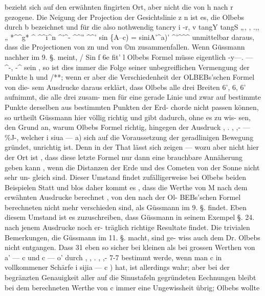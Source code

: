 \documentclass[10pt,a4paper]{article}
\begin{document}
bezieht  sich  auf  den  erwähnten  fingirten  Ort,  aber  nicht  die  von  h  nach  r  gezogene.    Die  Neigung  der
Projection  der  Gesichtslinie   z  n  ist  es,   die  Olbebs  durch  b\glqq{}   bezeichnet  und   für   die   also  nothwendig
tancry\glqq{}  \textbullet{}   i      -r,  v  tangY\glqq{}  tangS\glqq{}  „,    ,  .,,  „
*\textasciicircum{}\textasciicircum{}g*  \textasciicircum{}  \textasciicircum{}\textasciicircum{}i\textasciicircum{}n  \textasciicircum{}'\textasciicircum{}-  \textasciicircum{}\textasciicircum{}''  \glqq{}\glqq{}\glqq{}  \textasciicircum{}\textasciicircum{}'\glqq{}  sin  \{A\glqq{}--c\glqq{})  =  siniA'\textasciicircum{}a\glqq{})'  \textasciicircum{}'\textasciicircum{}\textasciicircum{}\textasciicircum{}  unmittelbar  daraus,
dass  die  Projectionen  von   zn  und  von   ©m  zusammenfallen.     Wenn  Güssmann  nachher  im  9.  §.  meint,
/\glqq{}  Sin  f  6e\glqq{}   fit'  \glqq{}l
Olbebs  Formel  müsse  eigentlich    -y---. --- \textasciicircum{}-,   -\textasciicircum{}  sein ,  so  ist  dies  immer  die  Folge  seiner  unbegreiflichen
Vermengung  der  Punkte  h  und  /**;  wenn  er  aber  die  Verschiedenheit  der  OLBEBs'schen  Formel  von  die-
sem Ausdrucke  daraus  erklärt,  dass  Olbebs  alle  drei  Breiten  6',  6\glqq{},  6'\glqq{}  aufnimmt,  die  alle  drei  zusam-
men für  eine  gerade  Linie  und  zwar  auf  bestimmte  Punkte  derselben  aus  bestimmten  Punkten  der  Erd-
chorde  nicht  passen  können,  so  urtheilt  Güssmann  hier  völlig  richtig  und  gibt  dadurch,  ohne  es  zu  wis-
sen,   den  Grund  an,  warum   Olbebs  Formel  richtig,  hingegen   der  Ausdruck      ,  .    ,  ,- --- \%J-,    welcher
i  siua\glqq{} --- a\glqq{})
sich  auf  die  Voraussetzung  der  geradlinigen  Bewegung  gründet,  unrichtig  ist.     Denn  in  der  That  lässt
sich  zeigen  ---  wozu  aber  nicht  hier  der  Ort  ist ,  dass  diese  letzte  Formel  nur  dann  eine  brauchbare
Annäherung  geben  kann ,  wenn  die  Distanzen  der  Erde  und  des  Cometen  von  der  Sonne  nicht  sehr  un-
gleich sind.  Dieser  Umstand  findet  zufälligerweise  bei  Olbebs  beiden  Beispielen  Statt  und  blos  daher
kommt  es ,  dass  die  Werthe  von  M  nach  dem  erwähnten  Ausdrucke  berechnet ,  von  den  nach  der  Ol-
BEBs'schen  Formel  berechneten  nicht  mehr  verschieden  sind,  als  Güssmann  im  9.  §.  findet.  Eben  diesem
Umstand  ist  es  zuzuschreiben,  dass  Güssmann  in  seinem  Exempel  §.  24.  nach  jenem  Ausdrucke  noch  er-
träglich richtige  Resultate  findet.  Die  trivialen  Bemerkungen,  die  Güssmann  im  11.  §.  macht,  sind  ge-
wiss auch  dem  Dr.  Olbebs  nicht  entgangen.    Dass  31  eben  so  sicher  bei  kleinen  als  bei  grossen  Werthen
von   a'\glqq{} ---  c\glqq{}  und  c\glqq{} ---  o'  durch    , ,   .    ,  ,-   7-7    bestimmt  werde,  wenn  man  c\glqq{}  in  vollkommener  Schärfe
i  sijia    ---  c  )
hat,  ist  allerdings  wahr;  aber  bei  der  begränzten  Genauigkeit  aller  auf  die  Sinustafeln  gegründeten
Eechnungen  bleibt  bei  dem  berechneten  Werthe  von  c\glqq{}  immer  eine  Ungewissheit  übrig;  Olbebs  wollte
\end{document}
